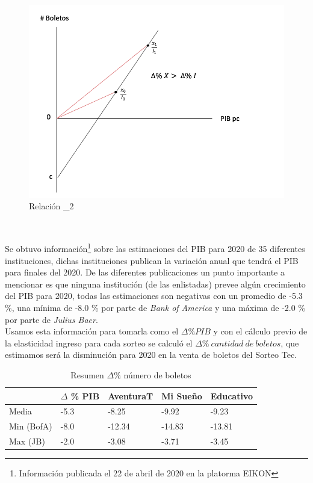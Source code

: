 \begin{figure}[H]
    \centering
    \caption{Relación \alpha_2}
    \label{fig:my_label}
    \includegraphics[width=.85\linewidth]{Imagenes/sorteo_gen2.png}
\end{figure} \\

\newpage



Se obtuvo información\footnote{Información publicada el 22 de abril de 2020 en la platorma EIKON} sobre las estimaciones del PIB para 2020 de 35 diferentes instituciones, dichas instituciones publican la variación anual que tendrá el PIB para finales del 2020. De las diferentes publicaciones un punto importante a mencionar es que ninguna institución (de las enlistadas) prevee algún crecimiento del PIB para 2020, todas las estimaciones son negativas con un promedio de -5.3 \%, una mínima de -8.0 \% por parte de \textit{Bank of America} y una máxima de -2.0 \% por parte de \textit{Julius Baer}. \\

Usamos esta información para tomarla como el $\Delta \% PIB$ y con el cálculo previo de la elasticidad ingreso para cada sorteo se calculó el $\Delta \%  \: cantidad \: de \: boletos$, que estimamos será la disminución para 2020 en la venta de boletos del Sorteo Tec. \\

\begin{table}[H]
\caption{Resumen $\Delta \%$ número de boletos}
\begin{tabular}{l|l|lll}
           & $\Delta$ \% PIB & AventuraT & Mi Sueño & Educativo \\ \hline
Media      & -5.3            & -8.25     & -9.92    & -9.23     \\
Min (BofA) & -8.0            & -12.34    & -14.83   & -13.81    \\
Max (JB)   & -2.0            & -3.08     & -3.71    & -3.45     \\ \hline
\end{tabular}
\end{table}


